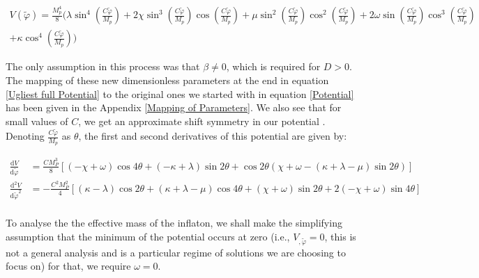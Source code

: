 \documentclass[aps,prd,reprint,preprintnumbers,showpacs,floatfix,nofootinbib,superscript address]{revtex4-2}
\begin{document}
\begin{widetext}
    \begin{equation} 
    \begin{aligned} \label{Ugliest full Potential}
        V(\tilde{\varphi}) =  \frac{M_p^4}{8} \Bigg(\lambda \sin^4\left( \frac{C \tilde{\varphi}}{M_p}\right) + 2 \chi \sin^3\left( \frac{C \tilde{\varphi}}{M_p}\right) \cos\left( \frac{C \tilde{\varphi}}{M_p}\right)  + \mu \sin^2\left( \frac{C \tilde{\varphi}}{M_p}\right) \cos^2\left( \frac{C \tilde{\varphi}}{M_p}\right) + 2\omega \sin\left( \frac{C \tilde{\varphi}}{M_p}\right) \cos^3\left( \frac{C \tilde{\varphi}}{M_p}\right)  \\ + \kappa \cos^4\left( \frac{C \tilde{\varphi}}{M_p}\right) \Bigg)
    \end{aligned}
\end{equation}
\end{widetext}
The only assumption in this process was that $\beta \neq 0$, which is required for $D > 0$. The mapping of these new dimensionless parameters at the end in equation \ref{Ugliest full Potential} to the original ones we started with in equation \ref{Potential} has been given in the Appendix \ref{Mapping of Parameters}. We also see that for small values of $C$, we get an approximate shift symmetry in our potential \cite{finelli_effective_2018}. Denoting $\frac{C\tilde{\varphi}}{M_p}$ as $\theta$, the first and second derivatives of this potential are given by:
\begin{widetext}
    \begin{equation} 
    \begin{aligned} \label{Derivatives of Pot}
    \frac{\text{d}V}{\text{d}\tilde{\varphi}} &= \frac{CM_P^3}{8} \left[ (-\chi + \omega) \cos4\theta + (-\kappa + \lambda) \sin2\theta + \cos2\theta (\chi + \omega - (\kappa + \lambda - \mu ) 
    \sin2\theta) \right] \nonumber \\
    \frac{\text{d}^2V}{\text{d}\tilde{\varphi}^2} &= -\frac{C^2M_P^2}{4} \left[ (\kappa - \lambda) \cos2\theta + (\kappa + \lambda - \mu) \cos4\theta + (\chi+\omega) \sin2\theta + 2(-\chi + \omega) \sin4\theta \right]  \\
    \end{aligned}
\end{equation}
\end{widetext}
To analyse the the effective mass of the inflaton, we shall make the simplifying assumption that the minimum of the potential occurs at zero (i.e., $V_{,\tilde{\varphi}} = 0$, this is not a general analysis and is a particular regime of solutions we are choosing to focus on) for that, we require $\omega = 0$.
\end{document}

